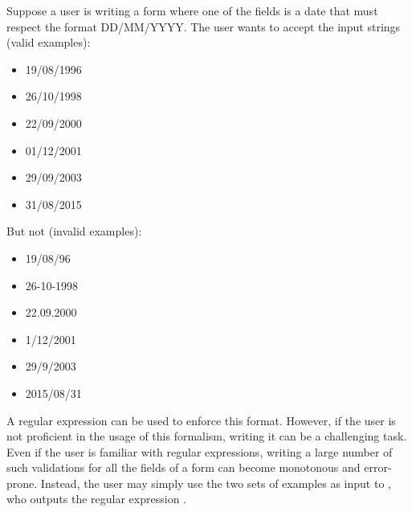 Suppose a user is writing a form where one of the fields is a date that must respect the format DD/MM/YYYY.
The user wants to accept the input strings (valid examples):
\begin{multicols}{3}
    \begin{itemize}[label={}]
    \item 19/08/1996
    \item 26/10/1998
    \item 22/09/2000
    \item 01/12/2001
    \item 29/09/2003
    \item 31/08/2015
    \end{itemize}
\end{multicols}
\noindent
But not (invalid examples):
\begin{multicols}{3}
\begin{itemize}[label={}]
\item 19/08/96
\item 26-10-1998
\item 22.09.2000
\item 1/12/2001
\item 29/9/2003
\item 2015/08/31
\end{itemize}
\end{multicols}
\noindent
A regular expression can be used to enforce this format. However, if the user is not proficient in the usage of this formalism, writing it can be a challenging task. Even if the user is familiar with regular expressions, writing a large number of such validations for all the fields of a form can become monotonous and error-prone.
Instead, the user may simply use the two sets of examples as input to \Forest{}, who outputs the regular expression .


